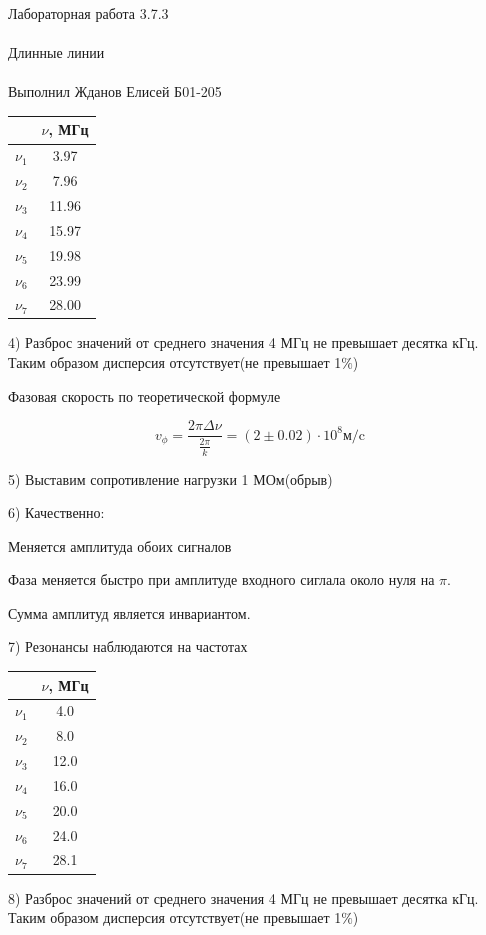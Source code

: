 \documentclass{astroedu-lab}
\begin{document}
\begin{problem}{\huge Лабораторная работа 3.7.3\\\\Длинные линии\\\\Выполнил Жданов Елисей Б01-205}
\begin{center}
\begin{tabular}{|c|c|}
\hline 
& $\nu$, МГц \\
\hline
$\nu_1$ & 3.97 \\
$\nu_2$ & 7.96 \\
$\nu_3$ & 11.96 \\
$\nu_4$ & 15.97 \\
$\nu_5$ & 19.98 \\
$\nu_6$ & 23.99 \\
$\nu_7$ & 28.00 \\
\hline
\end{tabular}
\end{center}

4) Разброс значений от среднего значения 4 МГц не превышает десятка кГц. Таким образом дисперсия отсутствует(не превышает 1$\%$)

Фазовая скорость по теоретической формуле

\begin{equation}
	v_\phi = \frac{2 \pi \Delta \nu}{\frac{2 \pi}{k}} = (2 \pm 0.02) \cdot 10^8 \text{м/c}
\end{equation}

5) Выставим сопротивление нагрузки 1 МОм(обрыв)

6) Качественно:

Меняется амплитуда обоих сигналов

Фаза меняется быстро при амплитуде входного сиглала около нуля на $\pi$.

Сумма амплитуд является инвариантом.

7) Резонансы наблюдаются на частотах

\begin{center}
\begin{tabular}{|c|c|}
\hline 
& $\nu$, МГц \\
\hline
$\nu_1$ & 4.0 \\
$\nu_2$ & 8.0 \\
$\nu_3$ & 12.0 \\
$\nu_4$ & 16.0 \\
$\nu_5$ & 20.0 \\
$\nu_6$ & 24.0 \\
$\nu_7$ & 28.1 \\
\hline
\end{tabular}
\end{center}

8) Разброс значений от среднего значения 4 МГц не превышает десятка кГц. Таким образом дисперсия отсутствует(не превышает 1$\%$)


\end{problem}
\end{document}
